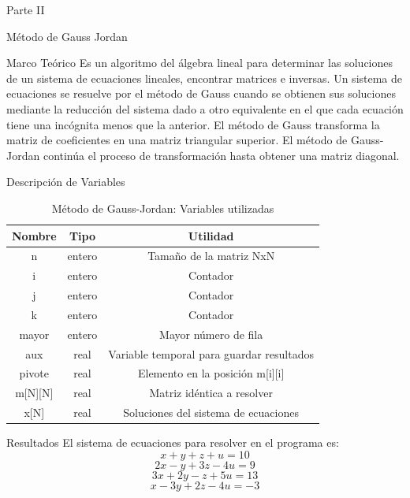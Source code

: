 \documentclass[legalpaper, 12pt]{article}
\begin{document}
\begin{section}{Parte II}
\begin{subsection}{Método de Gauss Jordan}
      \begin{subsubsection}{Marco Teórico}
        Es un algoritmo del álgebra lineal para determinar las soluciones
        de un sistema de ecuaciones lineales, encontrar matrices e inversas.
        Un sistema de ecuaciones se resuelve por el método de Gauss cuando se
        obtienen sus soluciones mediante la reducción del sistema dado a otro
        equivalente en el que cada ecuación tiene una incógnita menos que la anterior.
        El método de Gauss transforma la matriz de coeficientes en una matriz
        triangular superior. El método de Gauss-Jordan continúa el proceso de
        transformación hasta obtener una matriz diagonal.
      \end{subsubsection}
      \begin{subsubsection}{Descripción de Variables}
        \begin{table}[h]
          \centering
          \begin{tabular}{|c c c|}
            \hline
            Nombre & Tipo & Utilidad\\
            \hline\hline
            n & entero & Tamaño de la matriz NxN\\
            i & entero & Contador \\
            j & entero & Contador \\
            k & entero & Contador \\
            mayor & entero & Mayor número de fila \\
            aux & real & Variable temporal para guardar resultados \\
            pivote & real & Elemento en la posición m[i][i] \\
            m[N][N] & real & Matriz idéntica a resolver \\
            x[N] & real & Soluciones del sistema de ecuaciones \\
            \hline
          \end{tabular}
          \caption{Método de Gauss-Jordan: Variables utilizadas}
        \end{table}
      \end{subsubsection}
      \newpage
      \begin{subsubsection}{Resultados}
        El sistema de ecuaciones para resolver en el programa es:
        \[x+y+z+u=10\]
        \[2x-y+3z-4u=9\]
        \[3x+2y-z+5u=13\]
        \[x-3y+2z-4u=-3\]
        \begin{figure}[h]
          \centering

\end{figure}
\end{subsubsection}
\end{subsection}
\end{section}
\end{document}
